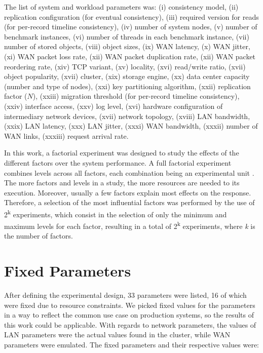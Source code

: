 \documentclass[man,floatsintext,12pt]{apa6}
\begin{document}
The list of system and workload parameters was: (i) consistency model, (ii)
replication configuration (for eventual consistency), (iii) required version
for reads (for per-record timeline consistency), (iv) number of system nodes,
(v) number of benchmark instances, (vi) number of threads in each benchmark
instance, (vii) number of stored objects, (viii) object sizes, (ix) WAN
latency, (x) WAN jitter, (xi) WAN packet loss rate, (xii) WAN packet
duplication rate, (xii) WAN packet reordering rate, (xiv) TCP variant, (xv)
locality, (xvi) read/write ratio, (xvii) object popularity, (xvii) cluster,
(xix) storage engine, (xx) data center capacity (number and type of nodes),
(xxi) key partitioning algorithm, (xxii) replication factor ($ N $), (xxiii)
migration threshold (for per-record timeline consistency), (xxiv) interface
access, (xxv) log level, (xvi) hardware configuration of intermediary network
devices, (xvii) network topology, (xviii) LAN bandwidth, (xxix) LAN latency,
(xxx) LAN jitter, (xxxi) WAN bandwidth, (xxxii) number of WAN links, (xxxiii)
request arrival rate.

In this work, a factorial experiment was designed to study the effects of the
different factors over the system performance. A full factorial experiment
combines levels across all factors, each combination being an experimental
unit \parencite{Jain1991}. The more factors and levels in a study, the more
resources are needed to its execution. Moreover, usually a few factors explain
most effects on the response. Therefore, a selection of the most influential
factors was performed by the use of 2\textsuperscript{k} experiments, which
consist in the selection of only the minimum and maximum levels for each
factor, resulting in a total of 2\textsuperscript{k} experiments, where
\textit{k} is the number of factors.

\section{Fixed Parameters}

After defining the experimental design, 33 parameters were listed, 16 of which
were fixed due to resource constraints. We picked fixed values for the
parameters in a way to reflect the common use case on production systems, so
the results of this work could be applicable. With regards to network
parameters, the values of LAN parameters were the actual values found in the
cluster, while WAN parameters were emulated. The fixed parameters and their
respective values were:
\end{document}
